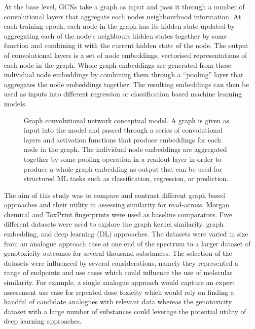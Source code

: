 \documentclass[
  super,
  preprint,
  3p]{elsarticle}
\begin{document}
At the base level, GCNs take a graph as input and pass it through a
number of convolutional layers that aggregate each nodes neighbourhood
information. At each training epoch, each node in the graph has its
hidden state updated by aggregating each of the node's neighbours hidden
states together by some function and combining it with the current
hidden state of the node. The output of convolutional layers is a set of
node embeddings, vectorised representations of each node in the graph.
Whole graph embeddings are generated from these individual node
embeddings by combining them through a ``pooling'' layer that aggregates
the node embeddings together. The resulting embeddings can then be used
as inputs into different regression or classification based machine
learning models.

\begin{figure}


\caption{\label{fig-gcn-concept}Graph convolutional network conceptual
model. A graph is given as input into the model and passed through a
series of convolutional layers and activation functions that produce
embeddings for each node in the graph. The individual node embeddings
are aggregated together by some pooling operation in a readout layer in
order to produce a whole graph embedding as output that can be used for
structured ML tasks such as classification, regression, or prediction.}

\end{figure}%

The aim of this study was to compare and contrast different graph based
approaches and their utility in assessing similarity for read-across.
Morgan chemical and ToxPrint fingerprints were used as baseline
comparators. Five different datasets were used to explore the graph
kernel similarity, graph embedding, and deep learning (DL) approaches.
The datasets were varied in size from an analogue approach case at one
end of the spectrum to a larger dataset of genotoxicity outcomes for
several thousand substances. The selection of the datasets were
influenced by several considerations, namely they represented a range of
endpoints and use cases which could influence the use of molecular
similarity. For example, a single analogue approach would capture an
expert assessment use case for repeated dose toxicity which would rely
on finding a handful of candidate analogues with relevant data whereas
the genotoxicity dataset with a large number of substances could
leverage the potential utility of deep learning approaches.
\end{document}
